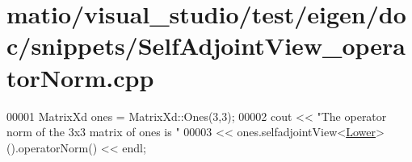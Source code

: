 \hypertarget{matio_2visual__studio_2test_2eigen_2doc_2snippets_2_self_adjoint_view__operator_norm_8cpp_source}{}\section{matio/visual\+\_\+studio/test/eigen/doc/snippets/\+Self\+Adjoint\+View\+\_\+operator\+Norm.cpp}
\label{matio_2visual__studio_2test_2eigen_2doc_2snippets_2_self_adjoint_view__operator_norm_8cpp_source}

\begin{DoxyCode}
00001 MatrixXd ones = MatrixXd::Ones(3,3);
00002 cout << \textcolor{stringliteral}{"The operator norm of the 3x3 matrix of ones is "}
00003      << ones.selfadjointView<\hyperlink{group__enums_gga39e3366ff5554d731e7dc8bb642f83cda891792b8ed394f7607ab16dd716f60e6}{Lower}>().operatorNorm() << endl;
\end{DoxyCode}
